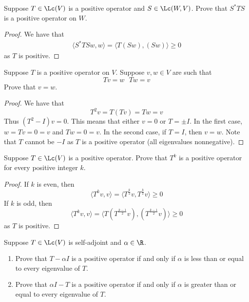 \documentclass{extarticle}
\begin{document}
\begin{problem}{9}
    Suppose \(T \in \Lc(V)\) is a positive operator and \(S \in \Lc(W, V)\). Prove that
    \(S^* T S\) is a positive operator on \(W\).
\end{problem}

\begin{proof}
We have that
\begin{align*}
    \langle S^*TS w,w \rangle
    = \langle T(Sw), (Sw) \rangle \geq 0
\end{align*}
as \(T\) is positive.
\end{proof}

\begin{problem}{10}
    Suppose \(T\) is a positive operator on \(V\). Suppose \(v, w \in V\) are such that
    \[Tv = w \ \ \ Tw = v\]
    Prove that \(v = w\).
\end{problem}

\begin{proof}
We have that
\[T^2 v = T(Tv) = Tw = v\]
Thus \((T^2 - I)v = 0\). This means that either \(v = 0\) or \(T = \pm I\). In the first case,
\(w = Tv = 0 = v\) and \(Tw = 0 = v\). In the second case, if \(T = I\), then \(v = w\). Note that
\(T\) cannot be \(-I\) as \(T\) is a positive operator (all eigenvalues nonnegative).
\end{proof}

\begin{problem}{12}
    Suppose \(T \in \Lc(V)\) is a positive operator. Prove that \(T^k\) is a positive operator
    for every positive integer \(k\).
\end{problem}

\begin{proof}
If \(k\) is even, then
\[\langle T^k v,v \rangle = \langle T^{\frac{k}{2}}v,T^{\frac{k}{2}}v \rangle \geq 0\]
If \(k\) is odd, then
\[\langle T^k v,v \rangle = \langle T(T^{\frac{k-1}{2}}v), (T^{\frac{k-1}{2}}v) \rangle \geq 0\]
as \(T\) is positive.
\end{proof}

\begin{problem}{13}
    Suppose \(T \in \Lc(V)\) is self-adjoint and \(\alpha \in \R\).
    \begin{enumerate}[label=(\alph*)]
        \item Prove that \(T - \alpha I\) is a positive operator if and only if \(\alpha\) is less
        than or equal to every eigenvalue of \(T\).
        \item Prove that \(\alpha I - T\) is a positive operator if and only if \(\alpha\) is
        greater than or equal to every eigenvalue of \(T\).
    \end{enumerate}
\end{problem}
\end{document}
